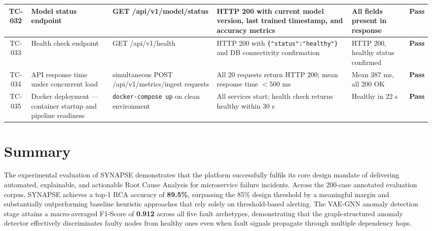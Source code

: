 \begin{center}
\begin{longtable}{|c|>{\RaggedRight\arraybackslash}p{3.2cm}|>{\RaggedRight\arraybackslash}p{3.5cm}|>{\RaggedRight\arraybackslash}p{3.5cm}|>{\RaggedRight\arraybackslash}p{2.2cm}|c|}
TC-032 & Model status endpoint & GET /api/v1/model/status & HTTP 200 with current model version, last trained timestamp, and accuracy metrics & All fields present in response & \textbf{Pass} \\
\hline

TC-033 & Health check endpoint & GET /api/v1/health & HTTP 200 with \texttt{\{"status":"healthy"\}} and DB connectivity confirmation & HTTP 200, healthy status confirmed & \textbf{Pass} \\
\hline

TC-034 & API response time under concurrent load & 20 simultaneous POST /api/v1/metrics/ingest requests & All 20 requests return HTTP 200; mean response time $<$500 ms & Mean 387 ms, all 200 OK & \textbf{Pass} \\
\hline

TC-035 & Docker deployment — container startup and pipeline readiness & \texttt{docker-compose up} on clean environment & All services start; health check returns healthy within 30 s & Healthy in 22 s & \textbf{Pass} \\

\end{longtable}
\end{center}

\section{Summary}

\hspace*{0.3in} The experimental evaluation of SYNAPSE demonstrates that the platform successfully fulfils its core design mandate of delivering automated, explainable, and actionable Root Cause Analysis for microservice failure incidents. Across the 200-case annotated evaluation corpus, SYNAPSE achieves a top-1 RCA accuracy of \textbf{89.5\%}, surpassing the 85\% design threshold by a meaningful margin and substantially outperforming baseline heuristic approaches that rely solely on threshold-based alerting. The VAE-GNN anomaly detection stage attains a macro-averaged F1-Score of \textbf{0.912} across all five fault archetypes, demonstrating that the graph-structured anomaly detector effectively discriminates faulty nodes from healthy ones even when fault signals propagate through multiple dependency hops.\\\\

